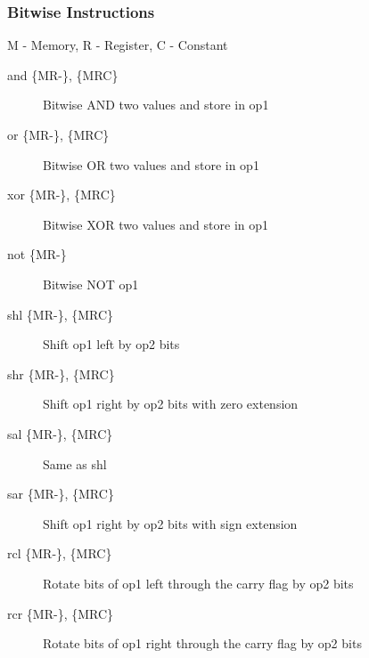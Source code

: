 \subsubsection*{Bitwise Instructions}
M - Memory, R - Register, C - Constant
\begin{description}
    \item[and \{MR-\}, \{MRC\}] Bitwise AND two values and store in op1
    \item[or \{MR-\}, \{MRC\}] Bitwise OR two values and store in op1
    \item[xor \{MR-\}, \{MRC\}] Bitwise XOR two values and store in op1
    \item[not \{MR-\}] Bitwise NOT op1
    \item[shl \{MR-\}, \{MRC\}] Shift op1 left by op2 bits
    \item[shr \{MR-\}, \{MRC\}] Shift op1 right by op2 bits with zero extension
    \item[sal \{MR-\}, \{MRC\}] Same as shl
    \item[sar \{MR-\}, \{MRC\}] Shift op1 right by op2 bits with sign extension    
    \item[rcl \{MR-\}, \{MRC\}] Rotate bits of op1 left through the carry flag by op2 bits
    \item[rcr \{MR-\}, \{MRC\}] Rotate bits of op1 right through the carry flag by op2 bits
\end{description}